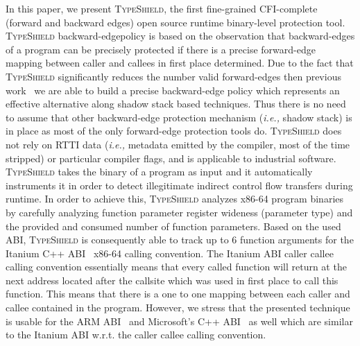 In this paper, we present \textsc{TypeShield}, the first fine-grained CFI-complete (forward and backward edges) open source runtime 
binary-level protection tool.
\textsc{TypeShield} backward-edgepolicy is based on the observation that backward-edges of a program can be precisely protected
if there is a precise forward-edge mapping between caller and callees in first place determined.
Due to the fact that \textsc{TypeShield} significantly reduces the number valid forward-edges then previous work~\cite{veen:typearmor} we are able 
to build a precise backward-edge policy which represents an effective alternative along shadow stack based techniques.
Thus there is no need to assume that other backward-edge protection mechanism (\textit{i.e.,} shadow stack) is in place as most of the only forward-edge protection tools do.
\textsc{TypeShield} does not rely on RTTI data (\textit{i.e.,} metadata emitted by the compiler, most of the time stripped) or particular compiler flags, and is applicable to industrial software.
\textsc{TypeShield} takes the binary of a program as input and it automatically instruments it in order to detect illegitimate indirect control flow transfers during runtime. 
In order to achieve this, 
\textsc{TypeShield} analyzes x86-64 program binaries by carefully analyzing function parameter register wideness (parameter type) and the provided and consumed number of function parameters. 
Based on the used ABI, \textsc{TypeShield} is consequently able to track up to 6 function arguments for the Itanium C++ ABI~\cite{itanium:abi} x86-64 calling convention. 
The Itanium ABI caller callee calling convention essentially means that every called function will return at the next address located after the callsite which was 
used in first place to call this function. This means that there is a one to one mapping between each caller and callee contained in the program.
However, we stress that the presented technique is usable for the ARM ABI~\cite{arm:abi} and Microsoft's C++ ABI~\cite{microsoft:abi} as well which are 
similar to the Itanium ABI w.r.t. the caller callee calling convention. 

